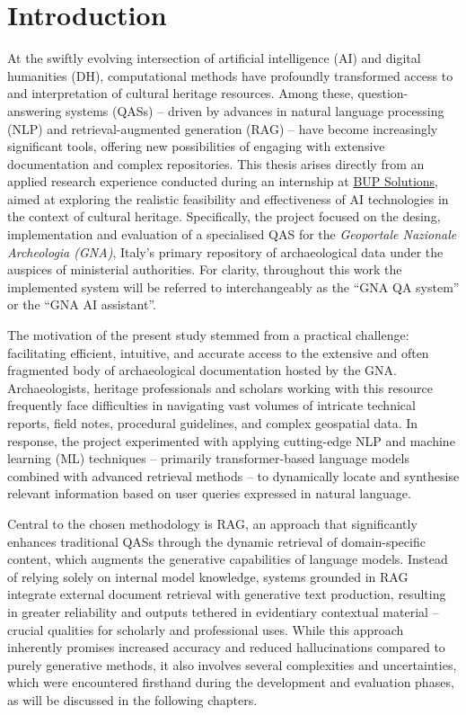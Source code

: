 \chapter{Introduction}
\label{chap:introduction}
\begin{spacing}{1.5}  %
At the swiftly evolving intersection of artificial intelligence (AI) and digital humanities (DH), computational methods have profoundly transformed access to and interpretation of cultural heritage resources. Among these, question-answering systems (QASs) -- driven by advances in natural language processing (NLP) and retrieval-augmented generation (RAG) -- have become increasingly significant tools, offering new possibilities of engaging with extensive documentation and complex repositories. This thesis arises directly from an applied research experience conducted during an internship at \href{https://www.bupsolutions.com/en/home_en/}{BUP Solutions}\nocite{bup_solutions_bup_nodate}, aimed at exploring the realistic feasibility and effectiveness of AI technologies in the context of cultural heritage. Specifically, the project focused on the desing, implementation and evaluation of a specialised QAS for the \textit{Geoportale Nazionale Archeologia (GNA)}, Italy’s primary repository of archaeological data under the auspices of ministerial authorities. For clarity, throughout this work the implemented system will be referred to interchangeably as the ``GNA QA system'' or the ``GNA AI assistant''.

The motivation of the present study stemmed from a practical challenge: facilitating efficient, intuitive, and accurate access to the extensive and often fragmented body of archaeological documentation hosted by the GNA. Archaeologists, heritage professionals and scholars working with this resource frequently face difficulties in navigating vast volumes of intricate technical reports, field notes, procedural guidelines, and complex geospatial data. In response, the project experimented with applying cutting-edge NLP and machine learning (ML) techniques -- primarily transformer-based language models combined with advanced retrieval methods -- to dynamically locate and synthesise relevant information based on user queries expressed in natural language.

Central to the chosen methodology is RAG, an approach that significantly enhances traditional QASs through the dynamic retrieval of domain-specific content, which augments the generative capabilities of language models. Instead of relying solely on internal model knowledge, systems grounded in RAG integrate external document retrieval with generative text production, resulting in greater reliability and outputs tethered in evidentiary contextual material -- crucial qualities for scholarly and professional uses. While this approach inherently promises increased accuracy and reduced hallucinations compared to purely generative methods, it also involves several complexities and uncertainties, which were encountered firsthand during the development and evaluation phases, as will be discussed in the following chapters.


\end{spacing}
